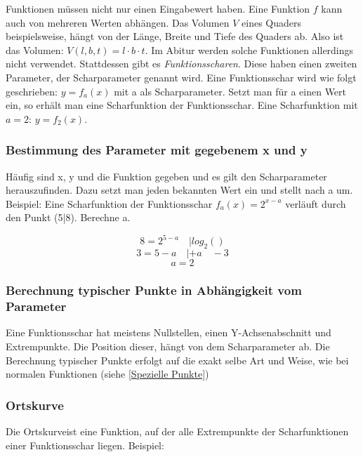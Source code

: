 \documentclass{article}
\begin{document}
Funktionen müssen nicht nur einen Eingabewert haben. Eine Funktion $f$ kann auch von mehreren Werten abhängen.
Das Volumen $V$ eines Quaders beispielsweise, hängt von der Länge, Breite und Tiefe des Quaders ab.
Also ist das Volumen: $V(l,b,t)=l \cdot b \cdot t$. Im Abitur werden solche Funktionen allerdings nicht verwendet.
Stattdessen gibt es \emph{Funktionsscharen}. Diese haben einen zweiten Parameter, der Scharparameter genannt wird.
Eine Funktionsschar wird wie folgt geschrieben: $y=f_a(x)$ mit a als Scharparameter. Setzt man für a einen Wert ein,
so erhält man eine Scharfunktion der Funktionsschar. Eine Scharfunktion mit $a=2$: $y=f_2(x)$.

\subsubsection{Bestimmung des Parameter mit gegebenem x und y}
Häufig sind x, y und die Funktion gegeben und es gilt den Scharparameter herauszufinden. Dazu setzt man jeden bekannten
Wert ein und stellt nach a um. Beispiel: Eine Scharfunktion der Funktionsschar $f_a(x)=2^{x-a}$
verläuft durch den Punkt (5|8). Berechne a.

\[ 8=2^{5-a} \quad | log_2() \]
\[ 3=5-a \quad | +a \quad -3 \]
\[ a=2 \]

\subsubsection{Berechnung typischer Punkte in Abhängigkeit vom Parameter}
Eine Funktionsschar hat meistens Nullstellen, einen Y-Achsenabschnitt und Extrempunkte. Die Position dieser,
hängt von dem Scharparameter ab. Die Berechnung typischer Punkte erfolgt auf die exakt selbe Art und Weise,
wie bei normalen Funktionen (siehe \ref{Spezielle Punkte})

\subsubsection{Ortskurve}

Die Ortskurveist eine Funktion, auf der alle Extrempunkte der Scharfunktionen einer Funktionsschar liegen. Beispiel:

\begin{figure}[H]
\centering
{}
\end{figure}    
\end{document}

